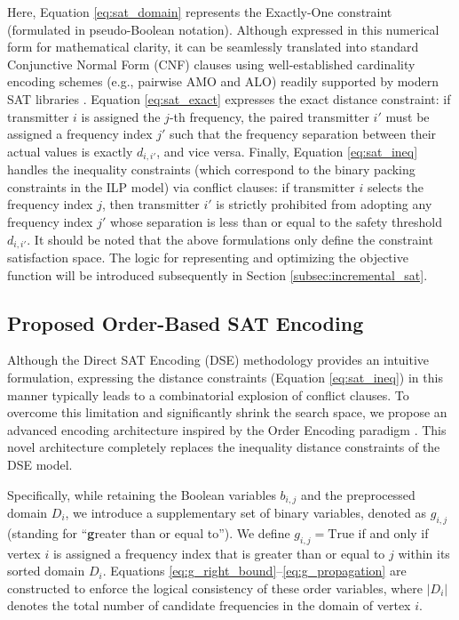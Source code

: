 \documentclass[letterpaper,journal]{IEEEtran}
\begin{document}
Here, Equation \eqref{eq:sat_domain} represents the Exactly-One constraint (formulated in pseudo-Boolean notation). Although expressed in this numerical form for mathematical clarity, it can be seamlessly translated into standard Conjunctive Normal Form (CNF) clauses using well-established cardinality encoding schemes (e.g., pairwise AMO and ALO) readily supported by modern SAT libraries \cite{imms-sat18, itk-sat24}. Equation \eqref{eq:sat_exact} expresses the exact distance constraint: if transmitter $i$ is assigned the $j$-th frequency, the paired transmitter $i'$ must be assigned a frequency index $j'$ such that the frequency separation between their actual values is exactly $d_{i,i'}$, and vice versa. Finally, Equation \eqref{eq:sat_ineq} handles the inequality constraints (which correspond to the binary packing constraints in the ILP model) via conflict clauses: if transmitter $i$ selects the frequency index $j$, then transmitter $i'$ is strictly prohibited from adopting any frequency index $j'$ whose separation is less than or equal to the safety threshold $d_{i,i'}$. It should be noted that the above formulations only define the constraint satisfaction space. The logic for representing and optimizing the objective function will be introduced subsequently in Section \ref{subsec:incremental_sat}.

\subsection{Proposed Order-Based SAT Encoding}
\label{subsec:order_encoding}

Although the Direct SAT Encoding (DSE) methodology provides an intuitive formulation, expressing the distance constraints (Equation \eqref{eq:sat_ineq}) in this manner typically leads to a combinatorial explosion of conflict clauses. To overcome this limitation and significantly shrink the search space, we propose an advanced encoding architecture inspired by the Order Encoding paradigm \cite{Petke2011Order_encoding}. This novel architecture completely replaces the inequality distance constraints of the DSE model.

Specifically, while retaining the Boolean variables $b_{i,j}$ and the preprocessed domain $D_i$, we introduce a supplementary set of binary variables, denoted as $g_{i,j}$ (standing for ``\textbf{g}reater than or equal to''). We define $g_{i,j} = \text{True}$ if and only if vertex $i$ is assigned a frequency index that is greater than or equal to $j$ within its sorted domain $D_i$. Equations \eqref{eq:g_right_bound}--\eqref{eq:g_propagation} are constructed to enforce the logical consistency of these order variables, where $|D_i|$ denotes the total number of candidate frequencies in the domain of vertex $i$.
\end{document}
